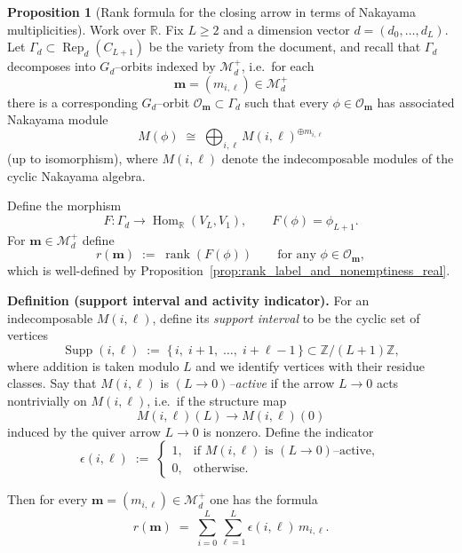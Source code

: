\documentclass{article}
\newcommand{\Hom}{\operatorname{Hom}}
\newcommand{\Rep}{\operatorname{Rep}}
\newcommand{\rank}{\operatorname{rank}}
\newcommand{\Supp}{\operatorname{Supp}}
\theoremstyle{definition}
\newtheorem{proposition}[theorem]{Proposition}
\begin{document}
\begin{proposition}[Rank formula for the closing arrow in terms of Nakayama multiplicities]
\label{prop:rank_formula_eps}
Work over $\mathbb{R}$. Fix $L\ge 2$ and a dimension vector $d=(d_0,\dots,d_L)$.
Let $\Gamma_d\subset \Rep_d(C_{L+1})$ be the variety from the document, and recall that
$\Gamma_d$ decomposes into $G_d$--orbits indexed by $\mathcal M_d^+$, i.e.\ for each
\[
\mathbf m=(m_{i,\ell})\in \mathcal M_d^+
\]
there is a corresponding $G_d$--orbit $\mathcal O_{\mathbf m}\subset \Gamma_d$ such that
every $\phi\in \mathcal O_{\mathbf m}$ has associated Nakayama module
\[
M(\phi)\;\cong\;\bigoplus_{i,\ell} M(i,\ell)^{\oplus m_{i,\ell}}
\]
(up to isomorphism), where $M(i,\ell)$ denote the indecomposable modules of the cyclic Nakayama algebra.

Define the morphism
\[
F:\Gamma_d\to \Hom_{\mathbb{R}}(V_L,V_1),
\qquad
F(\phi)=\phi_{L+1}.
\]
For $\mathbf m\in\mathcal M_d^+$ define
\[
r(\mathbf m)\;:=\;\rank(F(\phi))\qquad\text{for any }\phi\in\mathcal O_{\mathbf m},
\]
which is well-defined by Proposition~\ref{prop:rank_label_and_nonemptiness_real}.

\medskip
\noindent
\textbf{Definition (support interval and activity indicator).}
For an indecomposable $M(i,\ell)$, define its \emph{support interval} to be the cyclic set of vertices
\[
\Supp(i,\ell)\;:=\;\{\,i,\; i+1,\; \dots,\; i+\ell-1\,\}\subset \mathbb{Z}/(L+1)\mathbb{Z},
\]
where addition is taken modulo $L$ and we identify vertices with their residue classes.
Say that $M(i,\ell)$ is \emph{$(L\to 0)$--active} if the arrow $L\to 0$ acts nontrivially on $M(i,\ell)$,
i.e.\ if the structure map
\[
M(i,\ell)(L)\longrightarrow M(i,\ell)(0)
\]
induced by the quiver arrow $L\to 0$ is nonzero.
Define the indicator
\[
\epsilon(i,\ell)\;:=\;
\begin{cases}
1, & \text{if $M(i,\ell)$ is $(L\to 0)$--active},\\
0, & \text{otherwise}.
\end{cases}
\]

Then for every $\mathbf m=(m_{i,\ell})\in \mathcal M_d^+$ one has the formula
\begin{equation}
\label{eq:rank_formula_eps}
r(\mathbf m)\;=\;\sum_{i=0}^L\sum_{\ell=1}^L\epsilon(i,\ell)\,m_{i,\ell}.
\end{equation}
\end{proposition}
\end{document}
